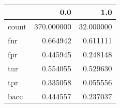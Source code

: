 \begin{tabular}{lrr}
\toprule
{} &         0.0 &        1.0 \\
\midrule
count &  370.000000 &  32.000000 \\
fnr   &    0.664942 &   0.611111 \\
fpr   &    0.445945 &   0.248148 \\
tnr   &    0.554055 &   0.529630 \\
tpr   &    0.335058 &   0.055556 \\
bacc  &    0.444557 &   0.237037 \\
\bottomrule
\end{tabular}
